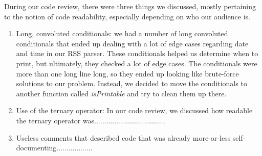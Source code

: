 \documentclass{article}
\begin{document}

During our code review, there were three things we discussed, mostly pertaining to the notion of code readability, especially depending on who our audience is.  

\begin{enumerate}
\item Long, convoluted conditionals: we had a number of long convoluted conditionals that ended up dealing with a lot of edge cases regarding date and time in our RSS parser.  These conditionals helped us determine when to print, but ultimately, they checked a lot of edge cases.  The conditionals were more than one long line long, so they ended up looking like brute-force solutions to our problem.  Instead, we decided to move the conditionals to another function called \emph{isPrintable} and try to clean them up there.
\item Use of the ternary operator: In our code review, we discussed how readable the ternary operator was....................................
\item Useless comments that described code that was already more-or-less self-documenting..................

\end{enumerate}
\end{document}
